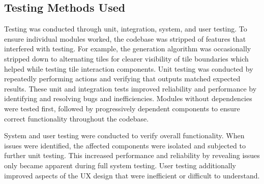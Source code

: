 \documentclass[14pt]{article}
\begin{document}
\subsection{Testing Methods Used}
Testing was conducted through unit, integration, system, and user testing.
To ensure individual modules worked, the codebase was stripped of features that interfered with testing.
For example, the generation algorithm was occasionally stripped down to alternating tiles for clearer visibility of tile boundaries which helped while testing tile interaction components.
Unit testing was conducted by repeatedly performing actions and verifying that outputs matched expected results.
These unit and integration tests improved reliability and performance by identifying and resolving bugs and inefficiencies.
Modules without dependencies were tested first, followed by progressively dependent components to ensure correct functionality throughout the codebase.

System and user testing were conducted to verify overall functionality.
When issues were identified, the affected components were isolated and subjected to further unit testing.
This increased performance and reliability by revealing issues only became apparent during full system testing.
User testing additionally improved aspects of the UX design that were inefficient or difficult to understand.
\end{document}

